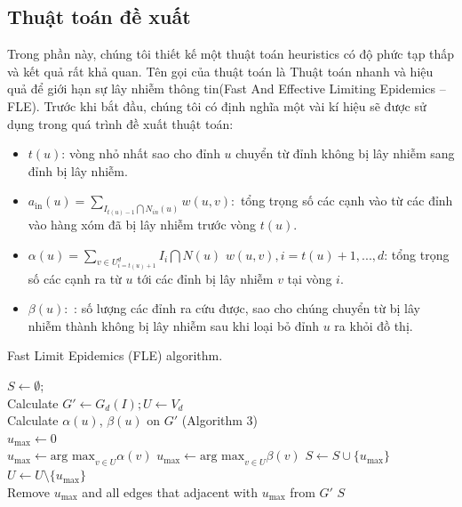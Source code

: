  	\subsection{Thuật toán đề xuất}
 	Trong phần này, chúng tôi thiết kế một thuật toán heuristics có độ phức tạp thấp và kết quả rất khả quan. Tên gọi của thuật toán là Thuật toán nhanh và hiệu quả để giới hạn sự lây nhiễm thông tin(Fast And Effective Limiting Epidemics – FLE). 
 	Trước khi bắt đầu, chúng tôi có định nghĩa một vài kí hiệu sẽ được sử dụng trong quá trình đề xuất thuật toán:
 	\begin {itemize}
 	\item $t(u)$: vòng nhỏ nhất sao cho đỉnh $u$ chuyển từ đỉnh không bị lây nhiễm sang đỉnh bị lây nhiễm.
 	
 	\item $a_{\text{in}}(u) = \sum_{I_{t(u) - 1} \bigcap N_{in}(u)} w(u,v):$ tổng trọng số các cạnh vào từ các đỉnh vào hàng xóm đã bị lây nhiễm trước vòng $t(u)$.
 	
 	\item $\alpha(u) = \sum_{v \in U^{d}_{i=t(u)+1}} I_{i} \bigcap N(u)$ $w(u,v), i = t(u) + 1, ... , d$: tổng trọng số các cạnh ra từ $u$ tới các đỉnh bị lây nhiễm $v$ tại vòng $i$.
 	
 	\item $\beta(u): $ : số lượng các đỉnh ra cứu được, sao cho chúng chuyển từ bị lây nhiễm thành không bị lây nhiễm sau khi loại bỏ đỉnh $u$ ra khỏi đồ thị.
 	\end {itemize}
 	 	\begin{algorithm}[H]
 		\caption{Fast Limit Epidemics (FLE) algorithm.}
 		\label{alg:Algo1}
 		$S \gets \emptyset$; 
 		\\
 		Calculate $G' \gets G_{d}(I); U \gets V_{d}$
 		\\
 		{
 			Calculate $\alpha(u)$, $\beta(u)$ on $G'$ (Algorithm 3)
 			\\
 			$u_{\text{max}} \gets 0$
 			\\
 			{
 				$u_{\text{max}} \gets \text{arg max}_{v \in U}\alpha(v)$
 			}
 			{
 				$u_{\text{max}} \gets \text{arg max}_{v \in U}\beta(v)$
 			}
 			$S \gets S \cup \{u_{\text{max}}\}$
 			\\
 			$U \gets U \setminus \{u_{\text{max}}\}$
 			\\
 			Remove $u_{\text{max}}$ and all edges that adjacent with $u_{\text{max}}$ from $G'$
 		}
 		\Return $S$
 	\end{algorithm}
  	
